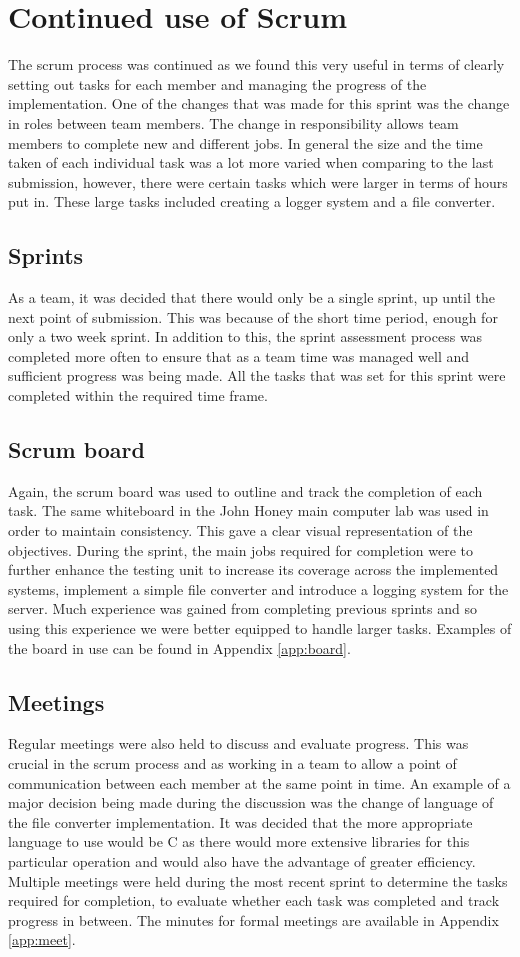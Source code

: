 \section{Continued use of Scrum}
The scrum process was continued as we found this very useful in terms of clearly setting out tasks for each member and managing the progress of the implementation. One of the changes that was made for this sprint was the change in roles between team members. The change in responsibility allows team members to complete new and different jobs. In general the size and the time taken of each individual task was a lot more varied when comparing to the last submission, however, there were certain tasks which were larger in terms of hours put in. These large tasks included creating a logger system and a file converter.
\subsection{Sprints}
As a team, it was decided that there would only be a single sprint, up until the next point of submission. This was because of the short time period, enough for only a two week sprint. In addition to this, the sprint assessment process was completed more often to ensure that as a team time was managed well and sufficient progress was being made. All the tasks that was set for this sprint were completed within the required time frame.
\subsection{Scrum board}
Again, the scrum board was used to outline and track the completion of each task. The same whiteboard in the John Honey main computer lab was used in order to maintain consistency. This gave a clear visual representation of the objectives. During the sprint, the main jobs required for completion were to further enhance the testing unit to increase its coverage across the implemented systems, implement a simple file converter and introduce a logging system for the server. Much experience was gained from completing previous sprints and so using this experience we were better equipped to handle larger tasks. Examples of the board in use can be found in Appendix \ref{app:board}.

\subsection{Meetings}
Regular meetings were also held to discuss and evaluate progress. This was crucial in the scrum process and as working in a team to allow a point of communication between each member at the same point in time. An example of a major decision being made during the discussion was the change of language of the file converter implementation. It was decided that the more appropriate language to use would be C as there would more extensive libraries for this particular operation and would also have the advantage of greater efficiency. Multiple meetings were held during the most recent sprint to determine the tasks required for completion, to evaluate whether each task was completed and track progress in between. 
The minutes for formal meetings are available in Appendix \ref{app:meet}.
